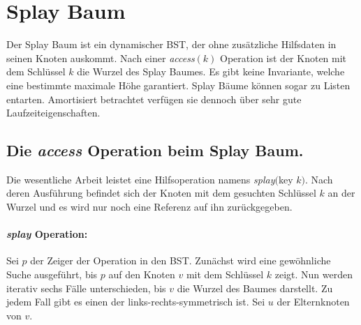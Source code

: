 \documentclass[a4paper,12pt]{article}
\begin{document}
\section{Splay Baum}
Der  Splay Baum \cite{splay} ist ein dynamischer BST, der ohne zusätzliche Hilfsdaten in seinen Knoten auskommt. Nach einer \textit{access}$\left(k\right)$ Operation ist der Knoten mit dem Schlüssel $k$ die Wurzel des Splay Baumes. Es gibt keine Invariante, welche eine bestimmte maximale Höhe garantiert. Splay Bäume können sogar zu Listen entarten. Amortisiert betrachtet verfügen sie dennoch über sehr gute Laufzeiteigenschaften. 


\subsection{Die \textit{access} Operation beim Splay Baum. }
Die wesentliche Arbeit leistet eine Hilfsoperation namens \textit{splay}$($key $k)$. Nach deren Ausführung befindet sich der Knoten mit dem gesuchten Schlüssel $k$ an der Wurzel und es wird nur noch eine Referenz auf ihn zurückgegeben.

\paragraph{\textit{splay} Operation:}
Sei $p$ der Zeiger der Operation in den BST. Zunächst wird eine gewöhnliche Suche ausgeführt, bis $p$ auf den Knoten $v$ mit dem Schlüssel $k$ zeigt. Nun werden iterativ sechs Fälle unterschieden, bis $v$ die Wurzel des Baumes darstellt. Zu jedem Fall gibt es einen der links-rechts-symmetrisch ist. Sei $u$ der Elternknoten von $v$. 
\end{document}
